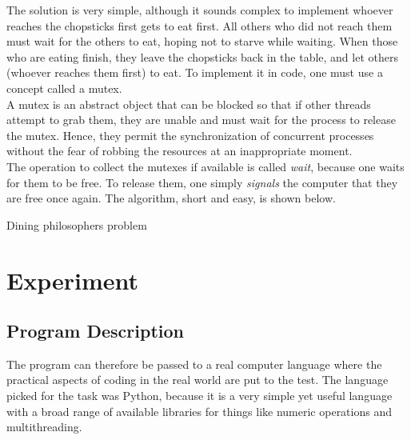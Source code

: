 \documentclass[12pt]{article}
\begin{document}
The solution is very simple, although it sounds complex to implement whoever reaches the chopsticks first gets to eat first. All others who did not reach them must wait for the others to eat, hoping not to starve while waiting. When those who are eating finish, they leave the chopsticks back in the table, and let others (whoever reaches them first) to eat. To implement it in code, one must use a concept called a mutex. \\

A mutex is an abstract object that can be blocked so that if other threads attempt to grab them, they are unable and must wait for the process to release the mutex. Hence, they permit the synchronization of concurrent processes without the fear of robbing the resources at an inappropriate moment. \\

The operation to collect the mutexes if available is called \emph{wait}, because one waits for them to be free. To release them, one simply \emph{signals} the computer that they are free once again. The algorithm, short and easy, is shown below. \\

\begin{algorithm}[H]
\SetAlgoLined
{}
\caption{Dining philosophers problem}
\end{algorithm}

\section{Experiment}

\subsection{Program Description}

The program can therefore be passed to a real computer language where the practical aspects of coding in the real world are put to the test. The language picked for the task was Python, because it is a very simple yet useful language with a broad range of available libraries for things like numeric operations and multithreading. \\
\end{document}

